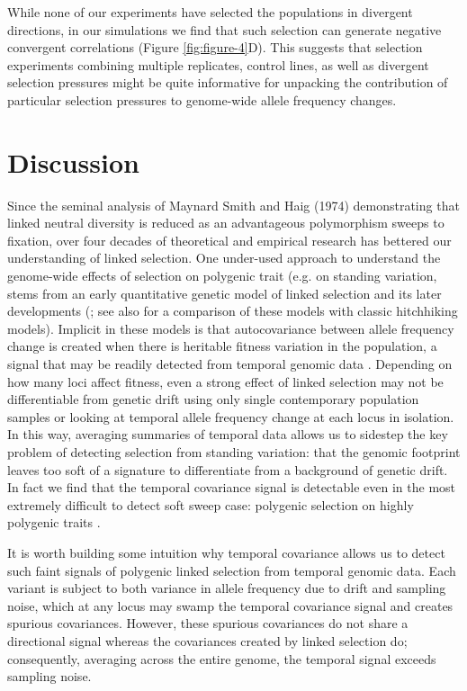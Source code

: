 \documentclass[9pt,twocolumn,twoside]{pnas-new}
\begin{document}
While none of our experiments have selected the populations in divergent
directions, in our simulations we find that such selection can generate
negative convergent correlations (Figure \ref{fig:figure-4}D). This suggests
that selection experiments combining multiple replicates, control lines, as
well as divergent selection pressures might be quite informative for unpacking
the contribution of particular selection pressures to genome-wide allele
frequency changes.

\section*{Discussion}

Since the seminal analysis of Maynard Smith and Haig (1974) demonstrating that
linked neutral diversity is reduced as an advantageous polymorphism sweeps to
fixation, over four decades of theoretical and empirical research has bettered
our understanding of linked selection.  One under-used approach to understand
the genome-wide effects of selection on polygenic trait (e.g.  on standing
variation, stems from an early quantitative genetic model of linked selection
\cite{Robertson1961-ho} and its later developments
(\cite{Santiago1995-hx,Santiago1998-bs,Wray1990-zf,Woolliams1993-qo}; see also
\cite{Barton2000-zg} for a comparison of these models with classic hitchhiking
models). Implicit in these models is that autocovariance between allele
frequency change is created when there is heritable fitness variation in the
population, a signal that may be readily detected from temporal genomic data
\cite{Buffalo2019-io}.  Depending on how many loci affect fitness, even a
strong effect of linked selection may not be differentiable from genetic drift
using only single contemporary population samples or looking at temporal allele
frequency change at each locus in isolation. In this way, averaging summaries
of temporal data allows us to sidestep the key problem of detecting selection
from standing variation: that the genomic footprint leaves too soft of a
signature to differentiate from a background of genetic drift. In fact we find
that the temporal covariance signal is detectable even in the most extremely
difficult to detect soft sweep case: polygenic selection on highly polygenic
traits \cite{Buffalo2019-io}.

It is worth building some intuition why temporal covariance allows us to detect
such faint signals of polygenic linked selection from temporal genomic data.
Each variant is subject to both variance in allele frequency due to drift and
sampling noise, which at any locus may swamp the temporal covariance signal and
creates spurious covariances. However, these spurious covariances do not share
a directional signal whereas the covariances created by linked selection do;
consequently, averaging across the entire genome, the temporal signal exceeds
sampling noise. 
\end{document}
